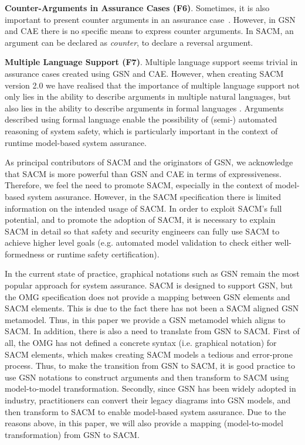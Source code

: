 \textbf{Counter-Arguments in Assurance Cases (F6)}. Sometimes, it is also important to present counter arguments in an assurance case~\cite{armstrong2004deconstruction}.
However, in GSN and CAE there is no specific means to express counter arguments. 
In SACM, an argument can be declared as \textit{counter}, to declare a reversal argument.

\textbf{Multiple Language Support (F7)}. Multiple language support seems trivial in assurance cases created using GSN and CAE.
However, when creating SACM version 2.0 we have realised that the importance of multiple language support not only lies in the ability to describe arguments in multiple natural languages, but also lies in the ability to describe arguments in formal languages \cite{denney2013formal}.
Arguments described using formal language enable the possibility of (semi-) automated reasoning of system safety, which is particularly important in the context of runtime model-based system assurance.

As principal contributors of SACM and the originators of GSN, we acknowledge that SACM is more powerful than GSN and CAE in terms of expressiveness.
Therefore, we feel the need to promote SACM, especially in the context of model-based system assurance.
However, in the SACM specification there is limited information on the intended usage of SACM. 
In order to exploit SACM's full potential, and to promote the adoption of SACM, it is necessary to explain SACM in detail so that safety and security engineers can fully use SACM to achieve higher level goals (e.g. automated model validation to check either well-formedness or runtime safety certification). 

In the current state of practice, graphical notations such as GSN remain the most popular approach for system assurance. 
SACM is designed to support GSN, but the OMG specification does not provide a mapping between GSN elements and SACM elements. 
This is due to the fact there has not been a SACM aligned GSN metamodel. 
Thus, in this paper we provide a GSN metamodel which aligns to SACM. 
In addition, there is also a need to translate from GSN to SACM. 
First of all, the OMG has not defined a concrete syntax (i.e. graphical notation) for SACM elements, which makes creating SACM models a tedious and error-prone process. 
Thus, to make the transition from GSN to SACM, it is good practice to use GSN notations to construct arguments and then transform to SACM using model-to-model transformation. 
Secondly, since GSN has been widely adopted in industry, practitioners can convert their legacy diagrams into GSN models, and then transform to SACM to enable model-based system assurance. 
Due to the reasons above, in this paper, we will also provide a mapping (model-to-model transformation) from GSN to SACM.

